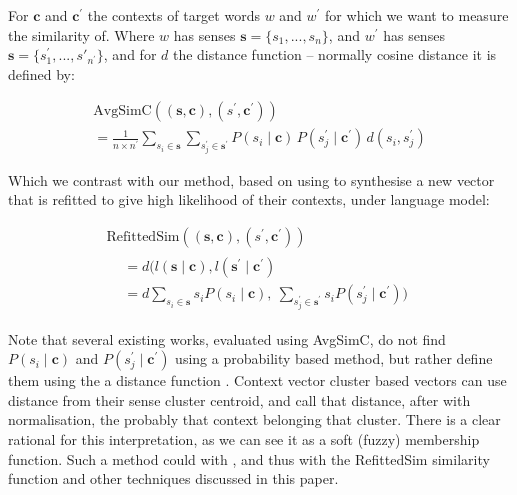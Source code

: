 \documentclass{sig-alternate}
\renewcommand{\c}{\mathbf{c}}
\newcommand{\s}{\mathbf{s}}
\begin{document}
For $\c$ and $\c^\prime$ the contexts of target words $w$ and $w^\prime$ for which we want to measure the similarity of. Where $w$ has senses $\s=\{s_1,...,s_n\}$, and $w^\prime$ has senses $\s=\{s^\prime_1,...,s\prime_{n^\prime}\}$, and for $d$ the distance function -- normally cosine distance it is defined by:


\begin{multline}
	\mathrm{AvgSimC}((\s,\c),(s^{\prime},\c^{\prime})) \\
	=  \frac{1}{n \times n^{\prime}} 
	\sum_{s_{i}\in\s}
	\sum_{s_{j}^{\prime}\in\s^{\prime}}
	P(s_{i}\mid\c)\,P(s_{j}^{\prime}\mid\c^{\prime})\,d(s_{i},s_{j}^{\prime})
\end{multline}

Which we contrast with our method, based on using  to synthesise a new vector that is refitted to give high likelihood of their contexts, under language model:

\begin{multline}
	\mathrm{RefittedSim}((\s,\c),(s^{\prime},\c^{\prime}))\\
	\begin{aligned}
	&= d(l(\s \mid \c), l(\s^\prime \mid \c^\prime)\\
	&= d
	\sum_{s_{i}\in\s}s_{i}P(s_{i}\mid\c),\:
	\sum_{s_{j}^{\prime}\in\s^{\prime}}s_{i}P(s_{j}^{\prime}\mid\c^{\prime}))
	\end{aligned}
\end{multline}

Note that several existing works, evaluated using AvgSimC, do not find $P(s_{i}\mid\c)$ and $P(s_{j}^{\prime}\mid\c^\prime)$ using a probability based method, but rather define them using the a distance function \parencite{Reisinger2010, Huang2012}. Context vector cluster based vectors can use distance from their sense cluster centroid, and call that distance, after with normalisation, the probably that context belonging that cluster. There is a clear rational for this interpretation, as we can see it as a soft (fuzzy) membership function. Such a method could with , and thus with the RefittedSim similarity function and other techniques discussed in this paper. 
 
\end{document}
